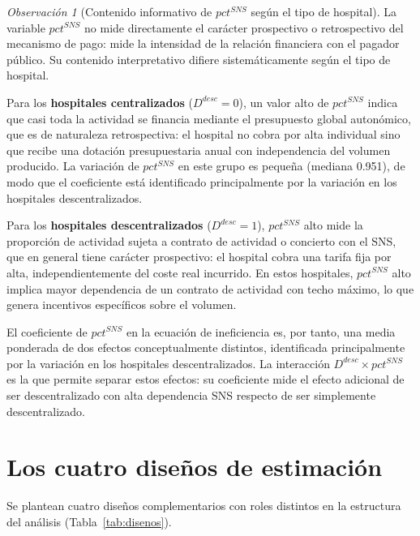 \documentclass[12pt, a4paper, twoside, openright]{book}
\theoremstyle{plain}
\theoremstyle{definition}
\theoremstyle{remark}
\newtheorem{remark}{Observación}[chapter]
\begin{document}
\begin{remark}[Contenido informativo de $pct^{SNS}$ según el tipo de hospital]
\label{rem:pctsns_asimetria}
La variable $pct^{SNS}$ no mide directamente el carácter prospectivo o retrospectivo del mecanismo de pago: mide la intensidad de la relación financiera con el pagador público. Su contenido interpretativo difiere sistemáticamente según el tipo de hospital.

Para los \textbf{hospitales centralizados} ($D^{desc}=0$), un valor alto de $pct^{SNS}$ indica que casi toda la actividad se financia mediante el presupuesto global autonómico, que es de naturaleza retrospectiva: el hospital no cobra por alta individual sino que recibe una dotación presupuestaria anual con independencia del volumen producido. La variación de $pct^{SNS}$ en este grupo es pequeña (mediana 0.951), de modo que el coeficiente está identificado principalmente por la variación en los hospitales descentralizados.

Para los \textbf{hospitales descentralizados} ($D^{desc}=1$), $pct^{SNS}$ alto mide la proporción de actividad sujeta a contrato de actividad o concierto con el SNS, que en general tiene carácter prospectivo: el hospital cobra una tarifa fija por alta, independientemente del coste real incurrido. En estos hospitales, $pct^{SNS}$ alto implica mayor dependencia de un contrato de actividad con techo máximo, lo que genera incentivos específicos sobre el volumen.

El coeficiente de $pct^{SNS}$ en la ecuación de ineficiencia es, por tanto, una media ponderada de dos efectos conceptualmente distintos, identificada principalmente por la variación en los hospitales descentralizados. La interacción $D^{desc}\times pct^{SNS}$ es la que permite separar estos efectos: su coeficiente mide el efecto adicional de ser descentralizado con alta dependencia SNS respecto de ser simplemente descentralizado.
\end{remark}

\section{Los cuatro diseños de estimación}

Se plantean cuatro diseños complementarios con roles distintos en la estructura del análisis (Tabla~\ref{tab:disenos}).
\end{document}
